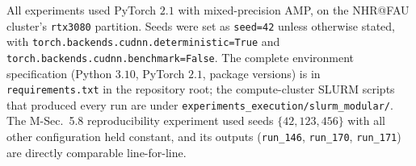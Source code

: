 \documentclass[11pt,a4paper]{article}
\begin{document}
All experiments used PyTorch $2.1$ with mixed-precision AMP, on the NHR@FAU cluster's \texttt{rtx3080} partition. Seeds were set as \texttt{seed=42} unless otherwise stated, with \texttt{torch.backends.cudnn.deterministic=True} and \texttt{torch.backends.cudnn.benchmark=False}. The complete environment specification (Python $3.10$, PyTorch $2.1$, package versions) is in \texttt{requirements.txt} in the repository root; the compute-cluster SLURM scripts that produced every run are under \texttt{experiments\_execution/slurm\_modular/}. The M-Sec.~5.8 reproducibility experiment used seeds $\{42, 123, 456\}$ with all other configuration held constant, and its outputs (\texttt{run\_146}, \texttt{run\_170}, \texttt{run\_171}) are directly comparable line-for-line.



\end{document}
